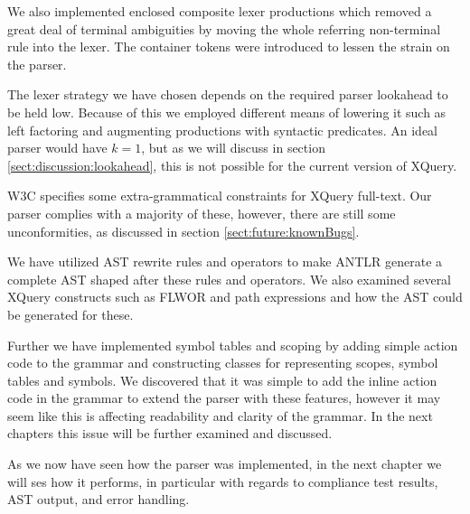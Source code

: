 We also implemented enclosed composite lexer productions which removed a great
deal of terminal ambiguities by moving the whole referring non-terminal rule
into the lexer. The container tokens were introduced to lessen the strain on
the parser.

The lexer strategy we have chosen depends on the required parser lookahead to
be held low. Because of this we employed different means of lowering it such as
left factoring and augmenting productions with syntactic predicates. An ideal
parser would have $k=1$, but as we will discuss in section
\ref{sect:discussion:lookahead}, this is not possible for the current version
of XQuery.

W3C specifies some extra-grammatical constraints for XQuery full-text. Our parser
complies with a majority of these, however, there are still some
unconformities, as discussed in section \ref{sect:future:knownBugs}.  

We have utilized AST rewrite rules and operators to make
ANTLR generate a complete AST shaped after these rules and operators. We also
examined several XQuery constructs such as FLWOR and path expressions and how
the AST could be generated for these.

Further we have implemented symbol tables and scoping by adding simple action
code to the grammar and constructing classes for representing scopes, symbol
tables and symbols. We discovered that it was simple to add the inline action 
code in the grammar to extend the parser with these features, however it may
seem like this is affecting readability and clarity of the grammar. In the next
chapters this issue will be further examined and discussed.

As we now have seen how the parser was implemented, in the next chapter we will
ses how it performs, in particular with regards to compliance test results, AST
output, and error handling.